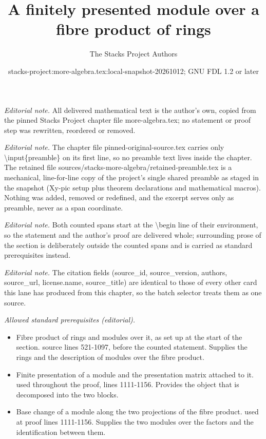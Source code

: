 \documentclass[10pt,a4paper]{amsart}
\title{A finitely presented module over a fibre product of rings}
\author{The Stacks Project Authors}
\date{stacks-project:more-algebra.tex:local-snapshot-20261012; GNU FDL 1.2 or later}
\theoremstyle{plain}
\theoremstyle{definition}
\theoremstyle{remark}
\numberwithin{equation}{subsection}
\begin{document}
\maketitle
\setcounter{subsection}{1}
\noindent\textit{Editorial note.} All delivered mathematical text is the author's own, copied from the pinned Stacks Project chapter file more-algebra.tex; no statement or proof step was rewritten, reordered or removed.\par\medskip
\noindent\textit{Editorial note.} The chapter file pinned-original-source.tex carries only \textbackslash{}input\{preamble\} on its first line, so no preamble text lives inside the chapter. The retained file sources/stacks-more-algebra/retained-preamble.tex is a mechanical, line-for-line copy of the project's single shared preamble as staged in the snapshot (Xy-pic setup plus theorem declarations and mathematical macros). Nothing was added, removed or redefined, and the excerpt serves only as preamble, never as a span coordinate.\par\medskip
\noindent\textit{Editorial note.} Both counted spans start at the \textbackslash{}begin line of their environment, so the statement and the author's proof are delivered whole; surrounding prose of the section is deliberately outside the counted spans and is carried as standard prerequisites instead.\par\medskip
\noindent\textit{Editorial note.} The citation fields (source\_id, source\_version, authors, source\_url, license.name, source\_title) are identical to those of every other card this lane has produced from this chapter, so the batch selector treats them as one source.\par\medskip
\noindent\textit{Allowed standard prerequisites (editorial).}\begin{itemize}
\item Fibre product of rings and modules over it, as set up at the start of the section. source lines 521-1097, before the counted statement. Supplies the rings and the description of modules over the fibre product.
\item Finite presentation of a module and the presentation matrix attached to it. used throughout the proof, lines 1111-1156. Provides the object that is decomposed into the two blocks.
\item Base change of a module along the two projections of the fibre product. used at proof lines 1111-1156. Supplies the two modules over the factors and the identification between them.
\end{itemize}\medskip
\end{document}
